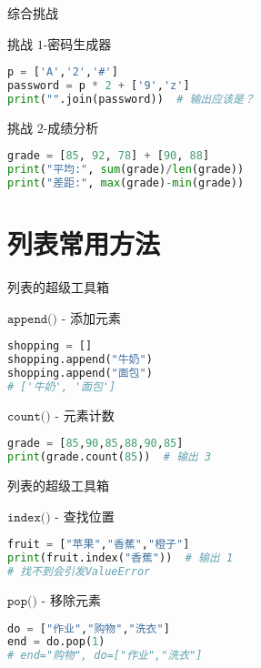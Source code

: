 \documentclass{beamer}
\begin{document}
\begin{frame}[fragile]{综合挑战}
\begin{block}{挑战 $1$-密码生成器}
\begin{lstlisting}[language=Python]
p = ['A','2','#']
password = p * 2 + ['9','z']
print("".join(password))  # 输出应该是？
\end{lstlisting}
\end{block}

\begin{block}{挑战 $2$-成绩分析}
\begin{lstlisting}[language=Python]
grade = [85, 92, 78] + [90, 88]
print("平均:", sum(grade)/len(grade))
print("差距:", max(grade)-min(grade))
\end{lstlisting}
\end{block}
\end{frame}

\section{列表常用方法}

\begin{frame}[fragile]{列表的超级工具箱}

\begin{block}{$\texttt{append()}$ - 添加元素}
\begin{lstlisting}[language=Python]
shopping = []
shopping.append("牛奶")
shopping.append("面包")
# ['牛奶', '面包']
\end{lstlisting}
\end{block}

\begin{block}{$\texttt{count()}$ - 元素计数}
\begin{lstlisting}[language=Python]
grade = [85,90,85,88,90,85]
print(grade.count(85))  # 输出 3
\end{lstlisting}
\end{block}
\end{frame}

\begin{frame}[fragile]{列表的超级工具箱}

\begin{block}{$\texttt{index()}$ - 查找位置}
\begin{lstlisting}[language=Python]
fruit = ["苹果","香蕉","橙子"]
print(fruit.index("香蕉"))  # 输出 1
# 找不到会引发ValueError
\end{lstlisting}
\end{block}

\begin{block}{$\texttt{pop()}$ - 移除元素}
\begin{lstlisting}[language=Python]
do = ["作业","购物","洗衣"]
end = do.pop(1) 
# end="购物", do=["作业","洗衣"]
\end{lstlisting}
\end{block}

\end{frame}
\end{document}
